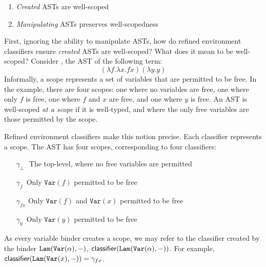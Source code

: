 \begin{enumerate}
  \item \textit{Created} ASTs are well-scoped
  \item \textit{Manipulating} ASTs preserves well-scopedness 
\end{enumerate}

First, ignoring the ability to manipulate ASTs, how do refined environment classifiers ensure \textit{created} ASTs are well-scoped? What does it mean to be well-scoped? Consider , the AST of the following term: 
\[(\lambda f. \lambda x. f x) (\lambda y. y)\]
Informally, a scope represents a set of variables that are permitted to be free. In the example, there are four scopes: one where no variables are free, one where only $f$ is free, one where $f$ and $x$ are free, and one where $y$ is free. An AST is well-scoped \textit{at a scope} if it is well-typed, and where the only free variables are those permitted by the scope. 

Refined environment classifiers make this notion precise. Each classifier represents a scope. The AST has four scopes, corresponding to four classifiers:
\begin{itemize}
\item[$\gamma_{\bot}$\,\,] The top-level, where no free variables are permitted 
\item[$\gamma_{f}$\;\,] Only $\texttt{Var}(f)$ permitted to be free
\item[$\gamma_{fx}$] Only $\texttt{Var}(f)$ and $\texttt{Var}(x)$ permitted to be free 
\item[$\gamma_{y}$\;\,] Only $\texttt{Var}(y)$ permitted to be free
\end{itemize}
As every variable binder creates a scope, we may refer to the classifier created by the binder $\texttt{Lam}(\texttt{Var}(\alpha), -)$, $\textsf{classifier}(\texttt{Lam}(\texttt{Var}(\alpha), -))$. For example, $\textsf{classifier}(\texttt{Lam}(\texttt{Var}(x), -)) = \gamma_{fx}$.

